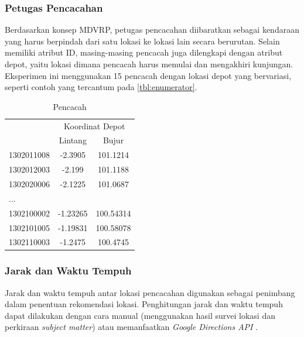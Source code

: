 \subsubsection{Petugas Pencacahan}
Berdasarkan konsep MDVRP, petugas pencacahan diibaratkan sebagai kendaraan yang harus berpindah dari satu lokasi ke lokasi lain secara berurutan. Selain memiliki atribut ID, masing-masing pencacah juga dilengkapi dengan atribut depot, yaitu lokasi dimana pencacah harus memulai dan mengakhiri kunjungan. Eksperimen ini menggunakan 15 pencacah dengan lokasi depot yang bervariasi, seperti contoh yang tercantum pada \autoref{tbl:enumerator}.


\begin{table}[!]
	\centering
	\captionsetup{format=hang}
	\caption{Pencacah}
	\label{tbl:enumerator}
	\begin{tabular}{lcc}
		\toprule
		& \multicolumn{2}{c}{Koordinat Depot}\\
		\cmidrule{2-3}
		& Lintang & Bujur\\ 
		\midrule
		1302011008 & -2.3905 & 101.1214\\
		1302012003 & -2.199 & 101.1188\\
		1302020006 & -2.1225 & 101.0687\\
		...\\
		1302100002 & -1.23265 & 100.54314\\
		1302101005 & -1.19831 & 100.58078\\
		1302110003 & -1.2475 & 100.4745\\
		\bottomrule
	\end{tabular}
\end{table}


\subsubsection{Jarak dan Waktu Tempuh}
\label{ss:distance-duration-matrix}
Jarak dan waktu tempuh antar lokasi pencacahan digunakan sebagai penimbang dalam penentuan rekomendasi lokasi. Penghitungan jarak dan waktu tempuh dapat dilakukan dengan cara manual (menggunakan hasil survei lokasi dan perkiraan \textit{subject matter}) atau memanfaatkan \textit{Google Directions API} \citep{google_google_2016}. 


